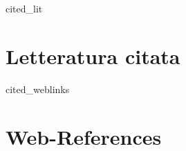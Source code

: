 \thispagestyle{empty}
\cleardoublepage
{}
{}

\begin{btSect}[plain]{cited_lit}
\section*{Letteratura citata}
\setlength{\bibhang}{2em}
\btPrintCited
\end{btSect}

\nocite{*} 
\begin{btSect}[plain]{cited_weblinks}
\section*{Web-References}
\setlength{\bibhang}{2em}
\btPrintCited
\end{btSect}
